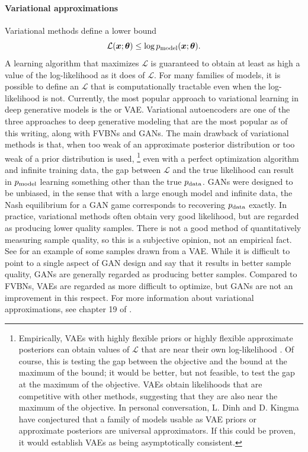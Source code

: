 \paragraph{Variational approximations}
Variational methods define a lower bound
\[ \mathcal{L}({\bm{x}}; {\bm{\theta}}) \leq \log p_{\rm{model}}({\bm{x}}; {\bm{\theta}}). \]
A learning algorithm that maximizes $\mathcal{L}$ is guaranteed to obtain at least
as high a value of the log-likelihood as it does of $\mathcal{L}$.
For many families of models, it is possible to define an $\mathcal{L}$ that is computationally
tractable even when the log-likelihood is not.
Currently, the most popular approach to variational learning in deep generative models
is the  \citep{Kingma-arxiv2013,Rezende-et-al-ICML2014} or VAE.
Variational autoencoders are one of the three approaches to deep generative modeling that are
the most popular as of this writing, along with FVBNs and GANs.
The main drawback of variational methods is that,
when too weak of an approximate posterior distribution or too weak of a prior distribution is used,
\footnote{
  Empirically, VAEs with highly flexible priors or highly flexible approximate posteriors
  can obtain values of $\mathcal{L}$ that are near their own log-likelihood
  \citep{kingma2016improving,chen2016variational}.
  Of course, this is testing the gap between the objective and the bound at the maximum of the bound;
  it would be better, but not feasible, to test the gap at the maximum of the objective.
  VAEs obtain likelihoods that are competitive with other methods, suggesting that they are also
  near the maximum of the objective.
  In personal conversation, L. Dinh and D. Kingma have conjectured that a family of models
  \citep{Dinh-et-al-arxiv2014,rezende2015variational,kingma2016improving,dinh2016density}
  usable as VAE priors or approximate posteriors are universal approximators.
  If this could be proven, it would establish VAEs as being asymptotically consistent.
}
even with a perfect optimization algorithm and infinite training data, the gap
between $\mathcal{L}$ and the true likelihood can result in $p_{\rm{model}}$ learning something other than
the true $p_{\rm{data}}$.
GANs were designed to be unbiased, in the sense that with a large enough model and infinite data,
the Nash equilibrium for a GAN game corresponds to recovering $p_{\rm{data}}$ exactly.
In practice, variational methods often obtain very good likelihood, but are regarded as producing
lower quality samples.
There is not a good method of quantitatively measuring sample quality, so this is a subjective opinion,
not an empirical fact.
See  for an example of some samples drawn from a VAE.
While it is difficult to point to a single aspect of GAN design and say that it results in
better sample quality, GANs are generally regarded as producing better samples.
Compared to FVBNs, VAEs are regarded as more difficult to optimize, but GANs are not
an improvement in this respect.
For more information about variational approximations, see chapter 19 of
\citet{Goodfellow-et-al-2016}.

